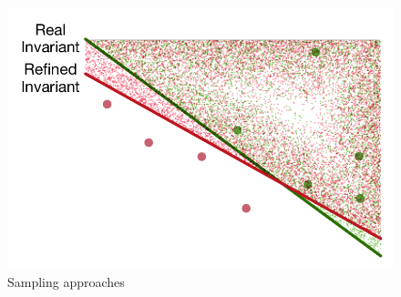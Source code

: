 \begin{figure}[t]
        \centering
        \includegraphics[scale=0.3]{figures/general-sampling-3.pdf}
    \caption{Sampling approaches}
    \label{fig:sampling}
\end{figure}

